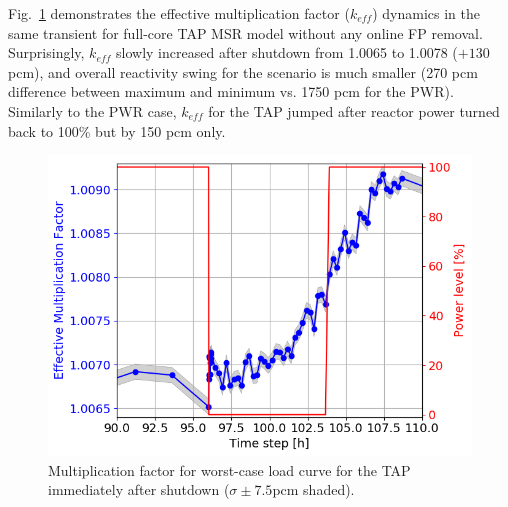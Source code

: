 \documentclass{anstrans}
\begin{document}
Fig.~\ref{fig:tap_keff} demonstrates the effective multiplication factor 
($k_{eff}$) dynamics in the same transient for full-core \gls{TAP} \gls{MSR} 
model without any online \gls{FP} removal. Surprisingly, $k_{eff}$ slowly 
increased after shutdown from 1.0065 to 1.0078 ($+130$ pcm), and overall  
reactivity swing for the scenario is much smaller (270 pcm difference between 
maximum and minimum vs. 1750 pcm for the \gls{PWR}). Similarly to the \gls{PWR} 
case, $k_{eff}$ for the \gls{TAP} jumped after reactor power turned back to 
100\% but by 150 pcm only. 
\begin{figure}[htbp!] %
	\centering
	\includegraphics[width=1.03\linewidth]{tap_keff_zoomed.png}
		\vspace{-0.25in}
	\caption{Multiplication factor for worst-case load curve for the \gls{TAP} 
	immediately after shutdown ($\sigma\pm7.5$pcm shaded).}
		\vspace{-0.05in}
	\label{fig:tap_keff}
\end{figure}
\end{document}
